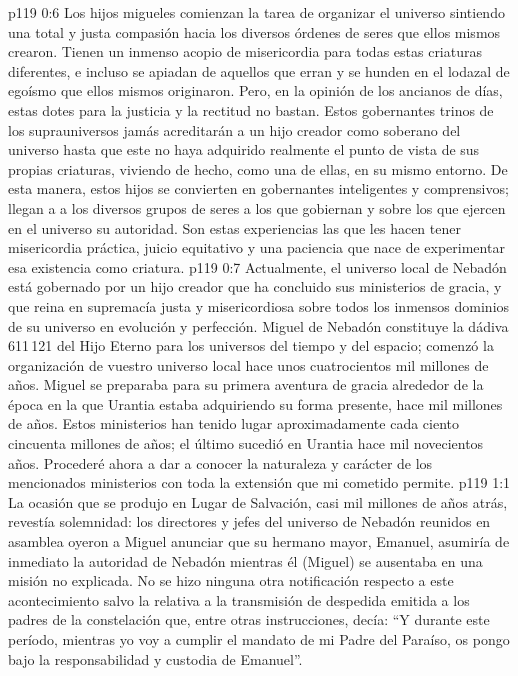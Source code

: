 \vs p119 0:6 Los hijos migueles comienzan la tarea de organizar el universo sintiendo una total y justa compasión hacia los diversos órdenes de seres que ellos mismos crearon. Tienen un inmenso acopio de misericordia para todas estas criaturas diferentes, e incluso se apiadan de aquellos que erran y se hunden en el lodazal de egoísmo que ellos mismos originaron. Pero, en la opinión de los ancianos de días, estas dotes para la justicia y la rectitud no bastan. Estos gobernantes trinos de los suprauniversos jamás acreditarán a un hijo creador como soberano del universo hasta que este no haya adquirido realmente el punto de vista de sus propias criaturas, viviendo de hecho, como una de ellas, en su mismo entorno. De esta manera, estos hijos se convierten en gobernantes inteligentes y comprensivos; llegan a  a los diversos grupos de seres a los que gobiernan y sobre los que ejercen en el universo su autoridad. Son estas experiencias las que les hacen tener misericordia práctica, juicio equitativo y una paciencia que nace de experimentar esa existencia como criatura.
\vs p119 0:7 \pc Actualmente, el universo local de Nebadón está gobernado por un hijo creador que ha concluido sus ministerios de gracia, y que reina en supremacía justa y misericordiosa sobre todos los inmensos dominios de su universo en evolución y perfección. Miguel de Nebadón constituye la dádiva 611\,121 del Hijo Eterno para los universos del tiempo y del espacio; comenzó la organización de vuestro universo local hace unos cuatrocientos mil millones de años. Miguel se preparaba para su primera aventura de gracia alrededor de la época en la que Urantia estaba adquiriendo su forma presente, hace mil millones de años. Estos ministerios han tenido lugar aproximadamente cada ciento cincuenta millones de años; el último sucedió en Urantia hace mil novecientos años. Procederé ahora a dar a conocer la naturaleza y carácter de los mencionados ministerios con toda la extensión que mi cometido permite.
\vs p119 1:1 La ocasión que se produjo en Lugar de Salvación, casi mil millones de años atrás, revestía solemnidad: los directores y jefes del universo de Nebadón reunidos en asamblea oyeron a Miguel anunciar que su hermano mayor, Emanuel, asumiría de inmediato la autoridad de Nebadón mientras él (Miguel) se ausentaba en una misión no explicada. No se hizo ninguna otra notificación respecto a este acontecimiento salvo la relativa a la transmisión de despedida emitida a los padres de la constelación que, entre otras instrucciones, decía: “Y durante este período, mientras yo voy a cumplir el mandato de mi Padre del Paraíso, os pongo bajo la responsabilidad y custodia de Emanuel”.
